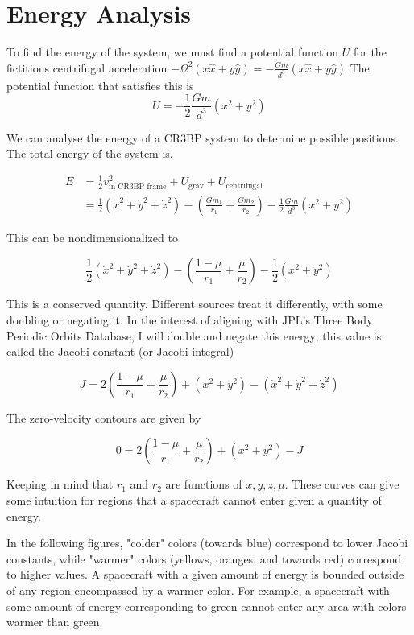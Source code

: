 \documentclass{article}
\begin{document}
\section*{Energy Analysis}

To find the energy of the system, we must find a potential function $U$ for the fictitious centrifugal acceleration $-\Omega^2 \left(x\hat{x}+y\hat{y}\right)=-\frac{Gm}{d^3}\left(x\hat{x}+y\hat{y}\right)$ The potential function that satisfies this is
\[U=-\frac{1}{2}\frac{Gm}{d^3}\left(x^2+y^2\right)\]

We can analyse the energy of a CR3BP system to determine possible positions. The total energy of the system is.

\[\begin{aligned}
    E&=\frac{1}{2}v_\text{in CR3BP frame}^2+U_\text{grav}+U_\text{centrifugal}\\
    &=\frac{1}{2}\left(\dot{x}^2+\dot{y}^2+\dot{z}^2\right)-\left(\frac{Gm_1}{r_1}+\frac{Gm_2}{r_2}\right)-\frac{1}{2}\frac{Gm}{d^3}\left(x^2+y^2\right)
\end{aligned}\]

This can be nondimensionalized to

\[\frac{1}{2}\left(\dot{x}^2+\dot{y}^2+\dot{z}^2\right)-\left(\frac{1-\mu}{r_1}+\frac{\mu}{r_2}\right)-\frac{1}{2}\left(x^2+y^2\right)\]

This is a conserved quantity. Different sources treat it differently, with some doubling or negating it. In the interest of aligning with JPL's Three Body Periodic Orbits Database, I will double and negate this energy; this value is called the Jacobi constant (or Jacobi integral)

\[\boxed{J=2\left(\frac{1-\mu}{r_1}+\frac{\mu}{r_2}\right)+\left(x^2+y^2\right)-\left(\dot{x}^2+\dot{y}^2+\dot{z}^2\right)}\]

The zero-velocity contours are given by

\[0=2\left(\frac{1-\mu}{r_1}+\frac{\mu}{r_2}\right)+\left(x^2+y^2\right)-J\]

Keeping in mind that $r_1$ and $r_2$ are functions of $x, y, z, \mu$. These curves can give some intuition for regions that a spacecraft cannot enter given a quantity of energy.

In the following figures, "colder" colors (towards blue) correspond to lower Jacobi constants, while "warmer" colors (yellows, oranges, and towards red) correspond to higher values. A spacecraft with a given amount of energy is bounded outside of any region encompassed by a warmer color. For example, a spacecraft with some amount of energy corresponding to green cannot enter any area with colors warmer than green. 
\end{document}
